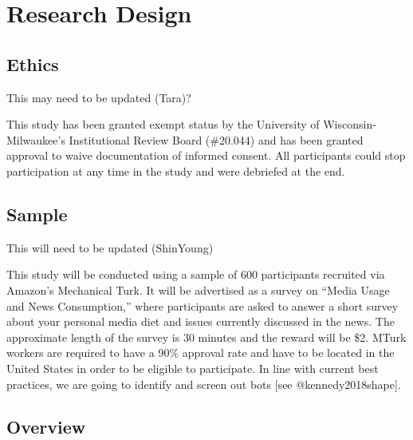 \documentclass[
]{article}
\begin{document}
\hypertarget{research-design}{%
\section{Research Design}\label{research-design}}

\hypertarget{ethics}{%
\subsection{Ethics}\label{ethics}}

This may need to be updated (Tara)?

This study has been granted exempt status by the University of
Wisconsin-Milwaukee's Institutional Review Board (\#20.044) and has been
granted approval to waive documentation of informed consent. All
participants could stop participation at any time in the study and were
debriefed at the end.

\hypertarget{sample}{%
\subsection{Sample}\label{sample}}

This will need to be updated (ShinYoung)

This study will be conducted using a sample of 600 participants
recruited via Amazon's Mechanical Turk. It will be advertised as a
survey on ``Media Usage and News Consumption,'' where participants are
asked to answer a short survey about your personal media diet and issues
currently discussed in the news. The approximate length of the survey is
30 minutes and the reward will be \$2. MTurk workers are required to
have a 90\% approval rate and have to be located in the United States in
order to be eligible to participate. In line with current best
practices, we are going to identify and screen out bots {[}see
@kennedy2018shape{]}.

\hypertarget{overview}{%
\subsection{Overview}\label{overview}}
\end{document}
